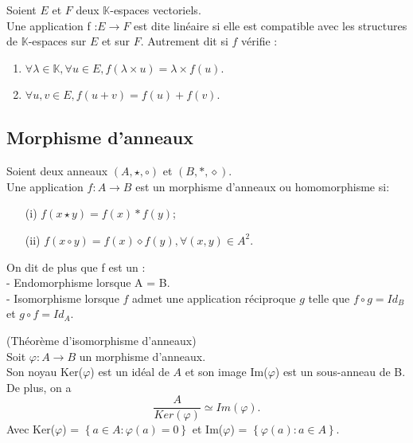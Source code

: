 \begin{madefinition}
	Soient $E$ et $F$ deux $\mathbb{K}$-espaces vectoriels.\\ Une application f :$E \longrightarrow F$ est dite linéaire si elle est compatible avec les structures de $\mathbb{K}$-espaces sur $E$ et sur $F$. Autrement dit si $f$ vérifie : 
	\begin{enumerate}
		\item $\forall \lambda \in \mathbb{K}, \forall u \in E, f(\lambda \times u) = \lambda \times f(u)$.
		\item $\forall u,v \in E, f(u+v) = f(u)+f(v)$.
	\end{enumerate}
\end{madefinition}

\subsection{Morphisme d'anneaux}
\begin{madefinition}
	Soient deux anneaux $(A,\star, \circ )$ et $(B, \ast, \diamond)$.\\
	Une application $f:A \longrightarrow B$ est un morphisme d'anneaux  ou homomorphisme si:
	\begin{enumerate}
		\item [(i)] $f(x \star y) = f(x) \ast f(y)$;
		\item [(ii)] $f(x \circ y) = f(x) \diamond f(y), \forall (x,y) \in A^2.$
	\end{enumerate}
	On dit de plus que f est un :\\
	- Endomorphisme lorsque A = B.\\
	- Isomorphisme lorsque $f$ admet une application réciproque $g$ telle que $f \circ g = Id_B$ et $g \circ f = Id_A$. 
\end{madefinition}
\begin{maproposition}
	(Théorème d'isomorphisme d’anneaux) \\
	Soit $\varphi:A \longrightarrow B$ un morphisme d'anneaux.\\
	Son noyau Ker($\varphi$) est un idéal de $A$ et son image Im($\varphi$) est un sous-anneau de B.\\ De plus, on a
	\[ \dfrac{A}{Ker(\varphi)} \simeq  Im(\varphi).\]
	Avec Ker($\varphi$) = $\left\{a \in A : \varphi(a) = 0 \right\}$ 
	et Im($\varphi$) = $\left\{\varphi(a) : a \in A \right\}$.
\end{maproposition}
